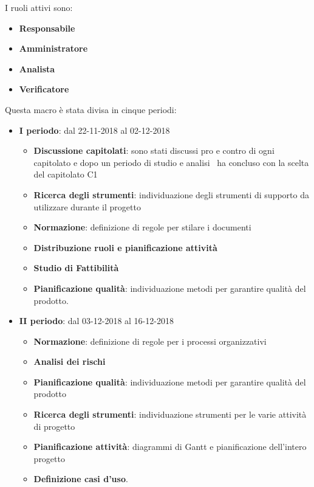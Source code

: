         I ruoli attivi sono:
        \begin{itemize}
            \item \textbf{Responsabile}
            \item \textbf{Amministratore}
            \item \textbf{Analista}
            \item \textbf{Verificatore}
        \end{itemize}
        Questa macro è stata divisa in cinque periodi:
		\begin{itemize}
			\item \textbf{I periodo}: dal 22-11-2018 al 02-12-2018
			\begin{itemize}
    	        \item \textbf{Discussione capitolati}: sono stati discussi pro e contro di ogni capitolato e dopo un periodo di
    	        studio e analisi \gruppo\ ha concluso con la scelta del capitolato C1
    	        \item \textbf{Ricerca degli strumenti}: individuazione degli strumenti di supporto da utilizzare durante il progetto
    	        \item \textbf{Normazione}: definizione di regole per stilare i documenti
    	        \item \textbf{Distribuzione ruoli e pianificazione attività}
       	        \item \textbf{Studio di Fattibilità}
       	        \item \textbf{Pianificazione qualità}: individuazione metodi per garantire qualità del prodotto.
        	\end{itemize}
			\item \textbf{II periodo}: dal 03-12-2018 al 16-12-2018
			\begin{itemize}
    	        \item \textbf{Normazione}: definizione di regole per i processi organizzativi
    	        \item \textbf{Analisi dei rischi}
    	        \item \textbf{Pianificazione qualità}: individuazione metodi per garantire qualità del prodotto
       	        \item \textbf{Ricerca degli strumenti}: individuazione strumenti per le varie attività di progetto
       	        \item \textbf{Pianificazione attività}: diagrammi di Gantt e pianificazione dell'intero progetto
       	        \item \textbf{Definizione casi d'uso}.

\end{itemize}
\end{itemize}
